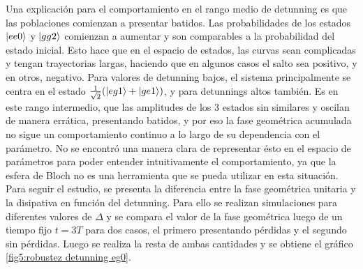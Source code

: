 Una explicación para el comportamiento en el rango medio de detunning es que las poblaciones comienzan a presentar batidos. Las probabilidades de los estados $\ket{ee0}$ y $\ket{gg2}$ comienzan a aumentar y son comparables a la probabilidad del estado inicial. Esto hace que en el espacio de estados, las curvas sean complicadas y tengan trayectorias largas, haciendo que en algunos casos el salto sea positivo, y en otros, negativo. Para valores de detunning bajos, el sistema principalmente se centra en el estado $\frac{1}{\sqrt{2}}(\ket{eg1}+\ket{ge1})$, y para detunnings altos también. Es en este rango intermedio, que las amplitudes de los 3 estados sin similares y oscilan de manera errática, presentando batidos, y por eso la fase geométrica acumulada no sigue un comportamiento continuo a lo largo de su dependencia con el parámetro. 
No se encontró una manera clara de representar ésto en el espacio de parámetros para poder entender intuitivamente el comportamiento, ya que la esfera de Bloch no es una herramienta que se pueda utilizar en esta situación. 
Para seguir el estudio, se presenta la diferencia entre la fase geométrica unitaria y la disipativa en función del detunning. Para ello se realizan simulaciones para diferentes valores de $\Delta$ y se compara el valor de la fase geométrica luego de un tiempo fijo $t=3T$ para dos casos, el primero presentando pérdidas y el segundo sin pérdidas. Luego se realiza la resta de ambas cantidades y se obtiene el gráfico \ref{fig5:robustez detunning eg0}.


